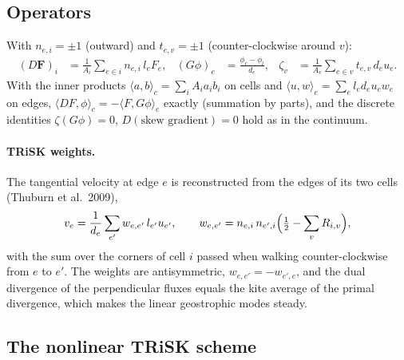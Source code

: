 \documentclass[11pt,a4paper]{article}
\newcommand{\bF}{\mathbf{F}}
\begin{document}
\subsection{Operators}

With $n_{e,i} = \pm1$ (outward) and $t_{e,v}=\pm1$ (counter-clockwise around $v$):
\begin{align}
  (D\bF)_i &= \frac1{A_i}\sum_{e\in i} n_{e,i}\,l_e F_e, &
  (G\phi)_e &= \frac{\phi_r - \phi_l}{d_e}, &
  \zeta_v &= \frac1{A_v}\sum_{e\in v} t_{e,v}\,d_e u_e.
\end{align}
With the inner products $\langle a,b\rangle_c = \sum_i A_ia_ib_i$ on cells and
$\langle u,w\rangle_e = \sum_e l_ed_e u_ew_e$ on edges,
$\langle D F,\phi\rangle_c = -\langle F, G\phi\rangle_e$ exactly (summation by parts), and
the discrete identities $\zeta(G\phi) = 0$, $D(\text{skew gradient}) = 0$ hold
as in the continuum.

\paragraph{TRiSK weights.} The tangential velocity at edge $e$ is reconstructed
from the edges of its two cells (Thuburn et al.\ 2009),
\begin{equation}
  v_e = \frac1{d_e}\sum_{e'} w_{e,e'}\,l_{e'}u_{e'},\qquad
  w_{e,e'} = n_{e,i}\,n_{e',i}\Bigl(\tfrac12 - \sum_{v} R_{i,v}\Bigr),
\end{equation}
with the sum over the corners of cell $i$ passed when walking counter-clockwise from
$e$ to $e'$. The weights are antisymmetric, $w_{e,e'} = -w_{e',e}$, and the dual divergence of the
perpendicular fluxes equals the kite average of the primal divergence, which
makes the linear geostrophic modes steady.

\subsection{The nonlinear TRiSK scheme}
\end{document}
